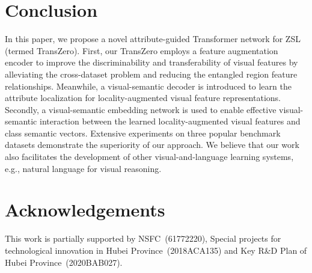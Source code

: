 \documentclass[letterpaper]{article} %
\begin{document}
	
	\section{Conclusion}\label{sec5}
	
	In this paper, we propose a novel attribute-guided Transformer network for ZSL (termed TransZero). First, our TransZero employs a feature augmentation encoder to improve the discriminability and transferability of visual features by alleviating the cross-dataset problem and reducing the entangled region feature relationships. Meanwhile, a visual-semantic decoder is introduced to learn the attribute localization for locality-augmented visual feature representations.  Secondly, a visual-semantic embedding network is used to enable effective visual-semantic interaction between the learned locality-augmented visual features and class semantic vectors. Extensive experiments on three popular benchmark datasets demonstrate the superiority of our approach. We believe that our work also facilitates the development of other visual-and-language learning systems, e.g., natural language for visual reasoning.
	
	
	\section*{Acknowledgements} This work is partially supported by NSFC~(61772220), Special projects for technological innovation in Hubei Province~(2018ACA135) and Key R\&D Plan of Hubei Province~(2020BAB027).
	
	
	
	
	
	
	
	
	
\end{document}
